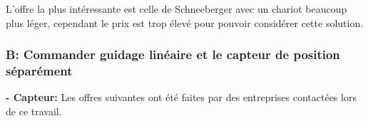 \begin{table}[H]
    \centering
    \caption{Offres pour le guidage linéaire avec mesure de position}
    \label{tab:OffreGuidPos}
\end{table}

L'offre la plus intéressante est celle de Schneeberger avec un chariot beaucoup plus léger, cependant le prix est trop élevé pour pouvoir considérer cette solution.

\subsubsection{B: Commander guidage linéaire et le capteur de position séparément}
\textbf{ - Capteur:}
\newline
Les offres suivantes ont été faites par des entreprises contactées lors de ce travail.

\begin{table}[H]
    \centering
    \caption{Offres pour le capteur pour la mesure de position}
    \label{tab:OffrePos}
\end{table}

